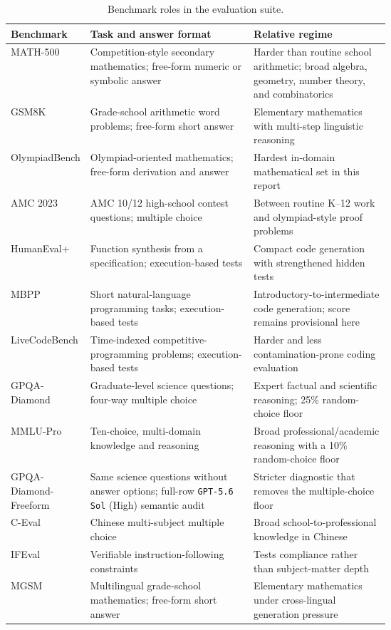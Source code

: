 \documentclass[10pt]{article}
\begin{document}
\begin{table}[H]
\centering
\small
\caption{Benchmark roles in the evaluation suite.}
\label{tab:benchmarkroles}
\begin{tabularx}{\linewidth}{>{\raggedright\arraybackslash}p{0.19\linewidth}
                             >{\raggedright\arraybackslash}p{0.43\linewidth}
                             >{\raggedright\arraybackslash}X}
\toprule
Benchmark & Task and answer format & Relative regime \\
\midrule
MATH-500 & Competition-style secondary mathematics; free-form numeric or symbolic answer & Harder than routine school arithmetic; broad algebra, geometry, number theory, and combinatorics \\
GSM8K & Grade-school arithmetic word problems; free-form short answer & Elementary mathematics with multi-step linguistic reasoning \\
OlympiadBench & Olympiad-oriented mathematics; free-form derivation and answer & Hardest in-domain mathematical set in this report \\
AMC 2023 & AMC 10/12 high-school contest questions; multiple choice & Between routine K--12 work and olympiad-style proof problems \\
HumanEval+ & Function synthesis from a specification; execution-based tests & Compact code generation with strengthened hidden tests \\
MBPP & Short natural-language programming tasks; execution-based tests & Introductory-to-intermediate code generation; score remains provisional here \\
LiveCodeBench & Time-indexed competitive-programming problems; execution-based tests & Harder and less contamination-prone coding evaluation \\
GPQA-Diamond & Graduate-level science questions; four-way multiple choice & Expert factual and scientific reasoning; 25\% random-choice floor \\
MMLU-Pro & Ten-choice, multi-domain knowledge and reasoning & Broad professional/academic reasoning with a 10\% random-choice floor \\
GPQA-Diamond-Freeform & Same science questions without answer options; full-row \texttt{GPT-5.6 Sol} (High) semantic audit & Stricter diagnostic that removes the multiple-choice floor \\
C-Eval & Chinese multi-subject multiple choice & Broad school-to-professional knowledge in Chinese \\
IFEval & Verifiable instruction-following constraints & Tests compliance rather than subject-matter depth \\
MGSM & Multilingual grade-school mathematics; free-form short answer & Elementary mathematics under cross-lingual generation pressure \\
\bottomrule
\end{tabularx}
\end{table}
\end{document}
